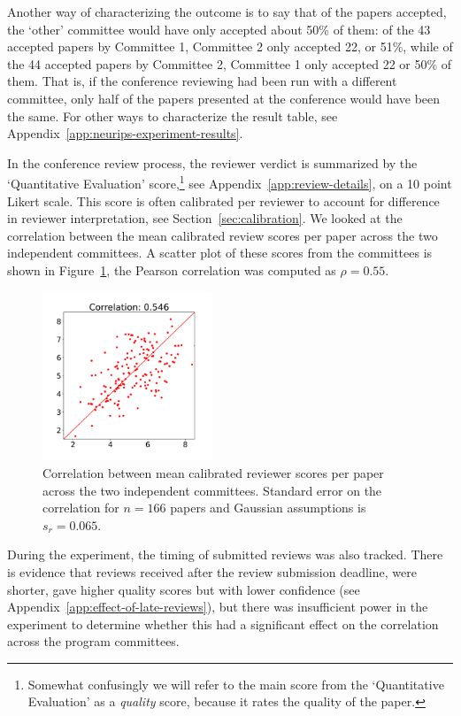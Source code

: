 \documentclass[twoside]{article}
\begin{document}
Another way of characterizing the outcome is to say that of the papers
accepted, the `other' committee would have only accepted about 50\% of them:
of the 43 accepted papers by Committee 1, Committee 2 only accepted
22, or 51\%, while of the 44 accepted papers by Committee 2, Committee
1 only accepted 22 or 50\% of them. That is, if the conference
reviewing had been run with a different committee, only half of the
papers presented at the conference would have been the same. For other
ways to characterize the result table, see Appendix~\ref{app:neurips-experiment-results}.

In the conference review process, the reviewer verdict is summarized by the `Quantitative Evaluation'
score,\footnote{Somewhat confusingly we will refer to the main score from the `Quantitative Evaluation' as a \emph{quality} score, because it rates the quality of the paper.} see Appendix~\ref{app:review-details}, on a 10 point Likert
scale.  This score is often calibrated per reviewer to account for
difference in reviewer interpretation, see
Section~\ref{sec:calibration}. We looked at the correlation between
the mean calibrated review
scores per paper across the two independent committees. A scatter plot of these
scores from the committees is shown in Figure~\ref{figure-calibrated-quality-correlation}, the Pearson correlation
was computed as $\rho=0.55$. 
\begin{figure}[htb]
\centering
\includegraphics[width=0.45\textwidth]{diagrams/neurips/calibrated-quality-correlation.pdf}

\caption{Correlation between mean calibrated reviewer scores per paper
  across the two
  independent committees. Standard error on the correlation for
  $n=166$ papers and Gaussian assumptions is $s_r = 0.065$.}
\label{figure-calibrated-quality-correlation}
\end{figure}

During the experiment, the timing of submitted reviews was also
tracked. There is evidence that reviews received after the review submission
deadline, were shorter, gave higher quality scores but with lower
confidence (see Appendix~\ref{app:effect-of-late-reviews}), but there
was insufficient power in the experiment to determine whether this had
a significant effect on the correlation across the program committees.
\end{document}
